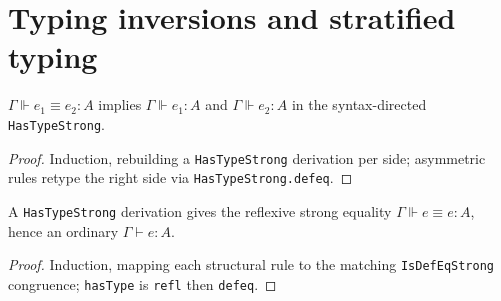 \section{Typing inversions and stratified typing}

\begin{theorem}
\label{thm:strong-hastype-prime}
\leanok
{}

 $\Gamma\Vdash e_1\equiv e_2:A$ implies $\Gamma\Vdash e_1:A$ and
$\Gamma\Vdash e_2:A$ in the syntax-directed \texttt{HasTypeStrong}.
\end{theorem}
\begin{proof}
\leanok
{} Induction, rebuilding a \texttt{HasTypeStrong} derivation per side; asymmetric
rules retype the right side via \texttt{HasTypeStrong.defeq}.
\end{proof}

\begin{lemma}
\label{fam:hastypestrong-basic}
\leanok
{}

 A \texttt{HasTypeStrong} derivation gives the reflexive strong equality
$\Gamma\Vdash e\equiv e:A$, hence an ordinary $\Gamma\vdash e:A$.
\end{lemma}
\begin{proof}
\leanok
{} Induction, mapping each structural rule to the matching \texttt{IsDefEqStrong}
congruence; \texttt{hasType} is \texttt{refl} then \texttt{defeq}.
\end{proof}

